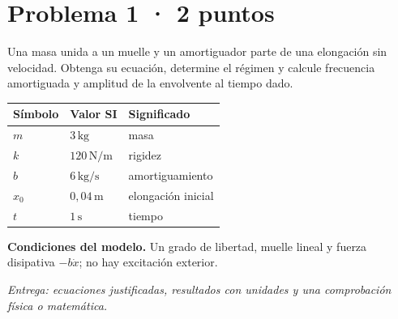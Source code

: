 \par\medskip\noindent\begin{minipage}{\linewidth}

\section{Problema 1 · 2 puntos}

Una masa unida a un muelle y un amortiguador parte de una elongación sin velocidad. Obtenga su ecuación, determine el régimen y calcule frecuencia amortiguada y amplitud de la envolvente al tiempo dado.

\begin{tabular}{@{}p{.15\linewidth}p{.23\linewidth}p{.54\linewidth}@{}}
\toprule Símbolo & Valor SI & Significado\\\midrule
$m$ & $3\,\mathrm{kg}$ & masa\\
$k$ & $120\,\mathrm{N/m}$ & rigidez\\
$b$ & $6\,\mathrm{kg/s}$ & amortiguamiento\\
$x_0$ & $0{,}04\,\mathrm{m}$ & elongación inicial\\
$t$ & $1\,\mathrm{s}$ & tiempo\\
\bottomrule\end{tabular}

\par\medskip\textbf{Condiciones del modelo.} Un grado de libertad, muelle lineal y fuerza disipativa $-b\dot x$; no hay excitación exterior.

\par\textit{Entrega: ecuaciones justificadas, resultados con unidades y una comprobación física o matemática.}

\end{minipage}\par\medskip

